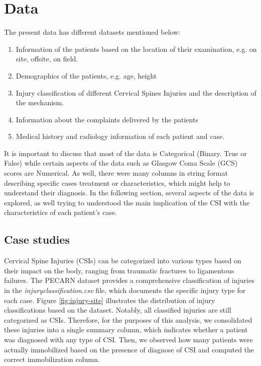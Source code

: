 \documentclass[10pt,letterpaper]{article}
\begin{document}
\section{Data}
The present data has different datasets mentioned below:
\begin{enumerate}
    \item Information of the patients based on the location of their examination, e.g. on site, offsite, on field.
    \item Demographics of the patients, e.g. age, height
    \item Injury classification of different Cervical Spines Injuries and the description of the mechanism.
    \item Information about the complaints delivered by the patients
    \item Medical history and radiology information of each patient and case.
\end{enumerate}

It is important to discuss that most of the data is Categorical (Binary. True or False) while certain aspects of the data such as Glasgow Coma Scale (GCS) scores are Numerical. As well, there were many columns in string format describing specific cases treatment or characteristics, which might help to understand their diagnosis. In the following section, several aspects of the data is explored, as well trying to understood the main implication of the CSI with the characteristics of each patient's case.

\subsection{Case studies}

Cervical Spine Injuries (CSIs) can be categorized into various types based on their impact on the body, ranging from traumatic fractures to ligamentous failures. The PECARN dataset provides a comprehensive classification of injuries in the \textit{injuryclassification.csv} file, which documents the specific injury type for each case. Figure \ref{fig:injury-site} illustrates the distribution of injury classifications based on the dataset. Notably, all classified injuries are still categorized as CSIs. Therefore, for the purposes of this analysis, we consolidated these injuries into a single summary column, which indicates whether a patient was diagnosed with any type of CSI. Then, we observed how many patients were actually immobilized based on the presence of diagnose of CSI and computed the correct immobilization column. 
\end{document}
